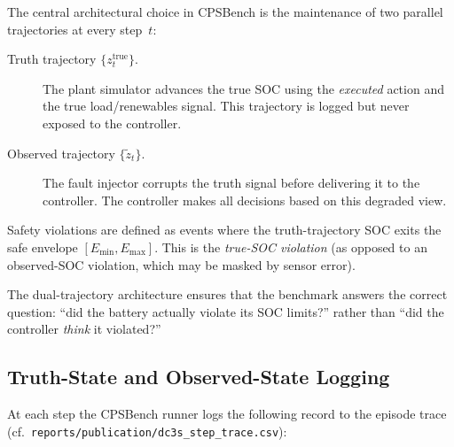 The central architectural choice in CPSBench is the maintenance of two
parallel trajectories at every step~$t$:

\begin{description}
  \item[Truth trajectory $\{z_t^{\mathrm{true}}\}$.]
    The plant simulator advances the true SOC using the
    \emph{executed} action and the true load/renewables signal.  This
    trajectory is logged but never exposed to the controller.

  \item[Observed trajectory $\{\tilde{z}_t\}$.]
    The fault injector corrupts the truth signal before delivering it to
    the controller.  The controller makes all decisions based on this
    degraded view.
\end{description}

Safety violations are defined as events where the truth-trajectory SOC
exits the safe envelope $[E_{\min}, E_{\max}]$.  This is the
\emph{true-SOC violation} (as opposed to an observed-SOC violation, which
may be masked by sensor error).

The dual-trajectory architecture ensures that the benchmark answers the
correct question: ``did the battery actually violate its SOC limits?''
rather than ``did the controller \emph{think} it violated?''

\subsection{Truth-State and Observed-State Logging}

At each step the CPSBench runner logs the following record to the episode
trace (cf.\ \texttt{reports/publication/dc3s\_step\_trace.csv}):

